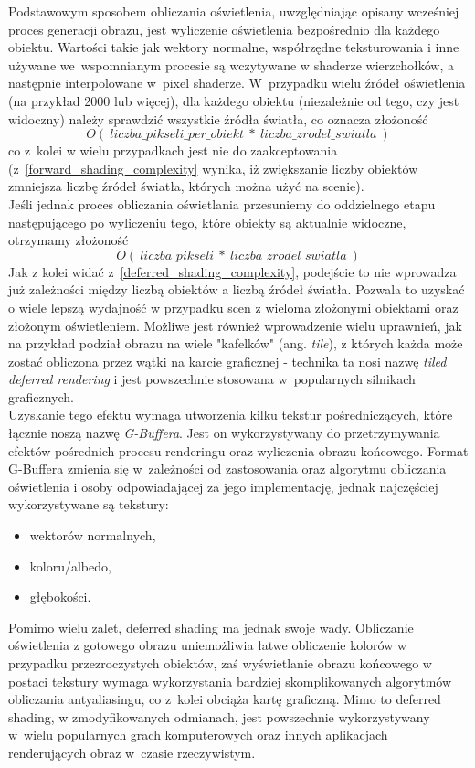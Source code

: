 Podstawowym sposobem obliczania oświetlenia, uwzględniając opisany wcześniej proces generacji obrazu, jest wyliczenie oświetlenia bezpośrednio dla każdego obiektu. Wartości takie jak wektory normalne, współrzędne teksturowania i inne używane we~wspomnianym procesie są wczytywane w shaderze wierzchołków, a następnie interpolowane w~pixel shaderze. W~przypadku wielu źródeł oświetlenia (na przykład 2000 lub więcej), dla każdego obiektu (niezależnie od tego, czy jest widoczny) należy sprawdzić wszystkie źródła światła, co oznacza złożoność
\begin{equation}
\label{forward_shading_complexity}
O(~liczba\_pikseli\_per\_obiekt~*~liczba\_zrodel\_swiatla~)
\end{equation}
co z~kolei w wielu przypadkach jest nie do zaakceptowania (z~\ref{forward_shading_complexity} wynika, iż zwiększanie liczby obiektów zmniejsza liczbę źródeł światła, których można użyć na scenie).\\
Jeśli jednak proces obliczania oświetlania przesuniemy do oddzielnego etapu następującego po wyliczeniu tego, które obiekty są aktualnie widoczne, otrzymamy złożoność
\begin{equation}
\label{deferred_shading_complexity}
O(~liczba\_pikseli~*~liczba\_zrodel\_swiatla~)
\end{equation}
Jak z kolei widać z~\ref{deferred_shading_complexity}, podejście to nie wprowadza już zależności między liczbą obiektów a liczbą źródeł światła. Pozwala to uzyskać o wiele lepszą wydajność w przypadku scen z wieloma złożonymi obiektami oraz złożonym oświetleniem. Możliwe jest również wprowadzenie wielu uprawnień, jak na przykład podział obrazu na wiele "kafelków" (ang. \emph{tile}), z których każda może zostać obliczona przez wątki na karcie graficznej - technika ta nosi nazwę \emph{tiled deferred rendering} i jest powszechnie stosowana w~popularnych silnikach graficznych.\\
Uzyskanie tego efektu wymaga utworzenia kilku tekstur pośredniczących, które łącznie noszą nazwę \emph{G-Buffera}. Jest on wykorzystywany do przetrzymywania efektów pośrednich procesu renderingu oraz wyliczenia obrazu końcowego. Format G-Buffera zmienia się w~zależności od zastosowania oraz algorytmu obliczania oświetlenia i osoby odpowiadającej za jego implementację, jednak najczęściej wykorzystywane są tekstury:
\begin{itemize}
\item wektorów normalnych,
\item koloru/albedo,
\item głębokości.
\end{itemize}
Pomimo wielu zalet, deferred shading ma jednak swoje wady. Obliczanie oświetlenia z gotowego obrazu uniemożliwia łatwe obliczenie kolorów w przypadku przezroczystych obiektów, zaś wyświetlanie obrazu końcowego w postaci tekstury wymaga wykorzystania bardziej skomplikowanych algorytmów obliczania antyaliasingu, co z~kolei obciąża kartę graficzną. Mimo to deferred shading, w zmodyfikowanych odmianach, jest powszechnie wykorzystywany w~wielu popularnych grach komputerowych oraz innych aplikacjach renderujących obraz w~czasie rzeczywistym.

